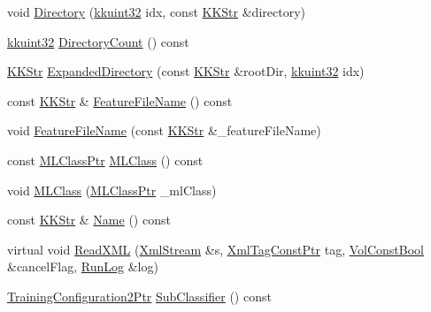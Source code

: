 \begin{DoxyCompactItemize}
\item 
void \hyperlink{class_k_k_m_l_l_1_1_training_class_abf1181b3c345a9b41dc2f7ef26f9caac}{Directory} (\hyperlink{namespace_k_k_b_af8d832f05c54994a1cce25bd5743e19a}{kkuint32} idx, const \hyperlink{class_k_k_b_1_1_k_k_str}{K\+K\+Str} \&directory)
\item 
\hyperlink{namespace_k_k_b_af8d832f05c54994a1cce25bd5743e19a}{kkuint32} \hyperlink{class_k_k_m_l_l_1_1_training_class_a03eefb1d4587c7220b23cec70b49aac2}{Directory\+Count} () const 
\item 
\hyperlink{class_k_k_b_1_1_k_k_str}{K\+K\+Str} \hyperlink{class_k_k_m_l_l_1_1_training_class_ace6d7708b3809e1183a9f6c86b2ee432}{Expanded\+Directory} (const \hyperlink{class_k_k_b_1_1_k_k_str}{K\+K\+Str} \&root\+Dir, \hyperlink{namespace_k_k_b_af8d832f05c54994a1cce25bd5743e19a}{kkuint32} idx)
\item 
const \hyperlink{class_k_k_b_1_1_k_k_str}{K\+K\+Str} \& \hyperlink{class_k_k_m_l_l_1_1_training_class_ac100a0f3d64b005c6daa56580acadd08}{Feature\+File\+Name} () const 
\item 
void \hyperlink{class_k_k_m_l_l_1_1_training_class_aeff54e698c6c48a94d92d1d80e918284}{Feature\+File\+Name} (const \hyperlink{class_k_k_b_1_1_k_k_str}{K\+K\+Str} \&\+\_\+feature\+File\+Name)
\item 
const \hyperlink{namespace_k_k_m_l_l_ac272393853d59e72e8456f14cd6d8c23}{M\+L\+Class\+Ptr} \hyperlink{class_k_k_m_l_l_1_1_training_class_a2f28d3ab6694f610fceeacd94ffee4ad}{M\+L\+Class} () const 
\item 
void \hyperlink{class_k_k_m_l_l_1_1_training_class_abedaa4f09f990ff402126826be91488a}{M\+L\+Class} (\hyperlink{namespace_k_k_m_l_l_ac272393853d59e72e8456f14cd6d8c23}{M\+L\+Class\+Ptr} \+\_\+ml\+Class)
\item 
const \hyperlink{class_k_k_b_1_1_k_k_str}{K\+K\+Str} \& \hyperlink{class_k_k_m_l_l_1_1_training_class_ae10b765db09d3aadabdffa35960c906a}{Name} () const 
\item 
virtual void \hyperlink{class_k_k_m_l_l_1_1_training_class_a3a006a2bbce2f7bdf39065498b9fc3ae}{Read\+X\+ML} (\hyperlink{class_k_k_b_1_1_xml_stream}{Xml\+Stream} \&s, \hyperlink{namespace_k_k_b_a5f1b0b1667d79fec26deeff10c43df23}{Xml\+Tag\+Const\+Ptr} tag, \hyperlink{namespace_k_k_b_a7d390f568e2831fb76b86b56c87bf92f}{Vol\+Const\+Bool} \&cancel\+Flag, \hyperlink{class_k_k_b_1_1_run_log}{Run\+Log} \&log)
\item 
\hyperlink{namespace_k_k_m_l_l_a5da4b334417f8c9e4e2fd5924da7fe62}{Training\+Configuration2\+Ptr} \hyperlink{class_k_k_m_l_l_1_1_training_class_a0e7f742efd6c2cd406f57da6622a02d7}{Sub\+Classifier} () const 

\end{DoxyCompactItemize}
